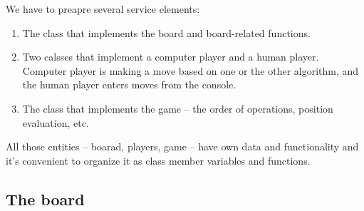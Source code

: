 We have to preapre several service elements:

\begin{enumerate}
\item The class that implements the board and board-related functions.
\item Two calsses that implement a computer player and a human player.
Computer player is making a move based on one or the other algorithm, and
the human player enters moves from the console.
\item The class that implements the game -- the order of operations,
position evaluation, etc.
\end{enumerate}

All those entities -- boarad, players, game -- have own data and functionality
and it's convenient to organize it as class member variables and functions.

\subsection{The board}





